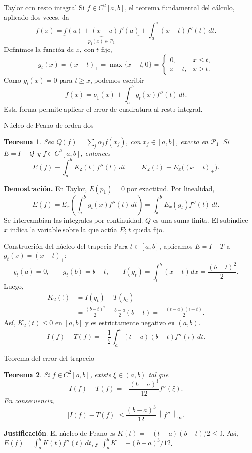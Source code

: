 \documentclass[aspectratio=169,12pt]{beamer}
\newcommand{\norm}[1]{\left\lVert#1\right\rVert}
\newcommand{\PiN}{\mathcal P}
\newtheorem{thm}{Teorema}
\begin{document}
\begin{frame}{Taylor con resto integral}
Si $f\in C^2[a,b]$, el teorema fundamental del cálculo, aplicado dos veces, da
\[
f(x)=\underbrace{f(a)+(x-a)f'(a)}_{p_1(x)\in\PiN_1}
+\int_a^x(x-t)f''(t)\,dt.
\]
Definimos la función de $x$, con $t$ fijo,
\[
g_t(x)=(x-t)_+=\max\{x-t,0\}
=\begin{cases}0,&x\leq t,\\x-t,&x>t.\end{cases}
\]
Como $g_t(x)=0$ para $t\geq x$, podemos escribir
\[f(x)=p_1(x)+\int_a^b g_t(x)f''(t)\,dt.\]
Esta forma permite aplicar el error de cuadratura al resto integral.
\end{frame}

\begin{frame}{Núcleo de Peano de orden dos}
\begin{thm}
Sea $Q(f)=\sum_j\alpha_j f(x_j)$, con $x_j\in[a,b]$, exacta en $\PiN_1$.
Si $E=I-Q$ y $f\in C^2[a,b]$, entonces
\[
E(f)=\int_a^b K_2(t)f''(t)\,dt,\qquad
K_2(t)=E_x\bigl((x-t)_+\bigr).
\]
\end{thm}
\textbf{Demostración.} En Taylor, $E(p_1)=0$ por exactitud. Por linealidad,
\[
E(f)=E_x\!\left(\int_a^b g_t(x)f''(t)\,dt\right)
=\int_a^b E_x(g_t)f''(t)\,dt.
\]
Se intercambian las integrales por continuidad; $Q$ es una suma finita.
El subíndice $x$ indica la variable sobre la que actúa $E$; $t$ queda fijo.
\end{frame}

\begin{frame}{Construcción del núcleo del trapecio}
Para $t\in[a,b]$, aplicamos $E=I-T$ a $g_t(x)=(x-t)_+$:
\[
g_t(a)=0,\qquad g_t(b)=b-t,\qquad
I(g_t)=\int_t^b(x-t)\,dx=\frac{(b-t)^2}{2}.
\]
Luego,
\begin{align*}
K_2(t)&=I(g_t)-T(g_t)\\
&=\frac{(b-t)^2}{2}-\frac{b-a}{2}(b-t)
=\boxed{-\frac{(t-a)(b-t)}{2}}.
\end{align*}
Así, $K_2(t)\leq0$ en $[a,b]$ y es estrictamente negativo en $(a,b)$.
\[
\boxed{I(f)-T(f)=-\frac12\int_a^b(t-a)(b-t)f''(t)\,dt.}
\]
\end{frame}

\begin{frame}{Teorema del error del trapecio}
\begin{thm}
Si $f\in C^2[a,b]$, existe $\xi\in(a,b)$ tal que
\[I(f)-T(f)=-\frac{(b-a)^3}{12}f''(\xi).\]
En consecuencia,
\[|I(f)-T(f)|\leq\frac{(b-a)^3}{12}\norm{f''}_\infty.\]
\end{thm}
\textbf{Justificación.} El núcleo de Peano es
$K(t)=-(t-a)(b-t)/2\leq0$. Así,
$E(f)=\int_a^bK(t)f''(t)\,dt$, y $\int_a^bK=-(b-a)^3/12$.
\end{frame}
\end{document}

